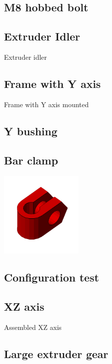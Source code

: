 \documentclass[11pt]{article}
\begin{document}
\hypertarget{thing_hobbed-bolt}{\subsection{M8 hobbed bolt}}

\hypertarget{thing_idler}{\subsection{Extruder Idler}}
Extruder idler

\hypertarget{thing_frame-with-y}{\subsection{Frame with Y axis}}
Frame with Y axis mounted

\hypertarget{thing_y-bushing}{\subsection{Y bushing}}

\hypertarget{thing_bar-clamp}{\subsection{Bar clamp}}
\includegraphics[width=4cm]{images/bar-clamp.png}

\hypertarget{thing_calibration}{\subsection{Configuration test}}

\hypertarget{thing_xz-axis}{\subsection{XZ axis}}
Assembled XZ axis

\hypertarget{thing_large-gear}{\subsection{Large extruder gear}}
\end{document}

